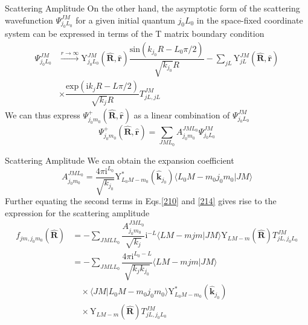 \documentclass{beamer}
\begin{document}
	\begin{frame}{Scattering Amplitude}
		On the other hand, the asymptotic form of the scattering wavefunction $\Psi^{JM}_{j_0L_0}$ for a given initial quantum $j_0L_0$ in the space-fixed coordinate system can be expressed in terms of the T matrix boundary condition 
		\begin{align}
			\Psi^{JM}_{j_0L_0}&\stackrel{r\rightarrow\infty}{\longrightarrow}\mathrm{Y}^{JM}_{j_0L_0}(\hat{\mathbf{R}},\hat{\mathbf{r}})\dfrac{\mathrm{sin}(k_{j_0}R-L_0\pi/2)}{\sqrt{k_{j_0}}R}-\sum\limits_{jL}\mathrm{Y}^{JM}_{jL}(\hat{\mathbf{R}},\hat{\mathbf{r}})\nonumber\\
			&\times\dfrac{\mathrm{exp}(\mathrm{i}k_{j}R-L\pi/2)}{\sqrt{k_{j}}R}T^{JM}_{jL,jL}
		\end{align}
		We can thus express $\Psi^+_{j_0m_0}(\hat{\mathbf{R}},\hat{\mathbf{r}})$ as a linear combination of $\Psi^{JM}_{j_0L_0}$
		\begin{equation}
			\Psi^+_{j_0m_0}(\hat{\mathbf{R}},\hat{\mathbf{r}})=\sum\limits_{JML_0}A^{JML_0}_{j_0m_0}\Psi^{JM}_{j_0L_0}
			\label{214}
		\end{equation}
	\end{frame}
	\begin{frame}{Scattering Amplitude}
		We can obtain the expansion coefficient
		\begin{equation}
			A^{JML_0}_{j_0m_0}=\dfrac{4\pi\mathrm{i}^{L_0}}{\sqrt{k_{j_0}}}\mathrm{Y}^*_{L_0M-m_0}(\hat{\mathbf{k}}_{j_0})\langle L_0M-m_0j_0m_0|JM\rangle
		\end{equation}
		Further equating the second terms in Eqs.\eqref{210} and \eqref{214} gives rise to the expression for the scattering amplitude
		\begin{align}
			f_{jm,j_0m_0}(\hat{\mathbf{R}})&=-\sum\limits_{JMLL_0}\dfrac{A^{JML_0}_{j_0m_0}}{\sqrt{k_{j}}}\mathrm{i}^{-L}\langle LM-mjm|JM\rangle\mathrm{Y}_{LM-m}(\hat{\mathbf{R}})T^{JM}_{jL,j_0L_0}\nonumber\\
			&=-\sum\limits_{JMLL_0}\dfrac{4\pi\mathrm{i}^{L_0-L}}{\sqrt{k_jk_{j_0}}}\langle LM-mjm|JM\rangle\nonumber\\
			&\quad\times\langle JM|L_0M-m_0j_0m_0\rangle\mathrm{Y}^*_{L_0M-m_0}(\hat{\mathbf{k}}_{j_0})\nonumber\\
			&\quad\times\mathrm{Y}_{LM-m}(\hat{\mathbf{R}})T^{JM}_{jL,j_0L_0}
		\end{align}
	\end{frame}
\end{document}
